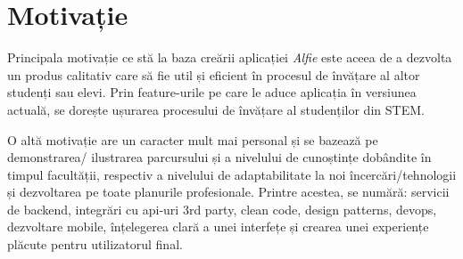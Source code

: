 \section{Motivație}

Principala motivație ce stă la baza creării aplicației \textit{Alfie} este aceea de a dezvolta un produs calitativ care să fie util și eficient în procesul de învățare al altor studenți sau elevi. Prin feature-urile pe care le aduce aplicația în versiunea actuală, se dorește ușurarea procesului de învățare al studenților din STEM.

O altă motivație are un caracter mult mai personal și se bazează pe demonstrarea/ ilustrarea parcursului și a nivelului de cunoștințe dobândite în timpul facultății, respectiv a nivelului de adaptabilitate la noi încercări/tehnologii și dezvoltarea pe toate planurile profesionale. Printre acestea, se numără: servicii de backend, integrări cu api-uri 3rd party, clean code, design patterns, devops, dezvoltare mobile, înțelegerea clară a unei interfețe și crearea unei experiențe plăcute pentru utilizatorul final.

